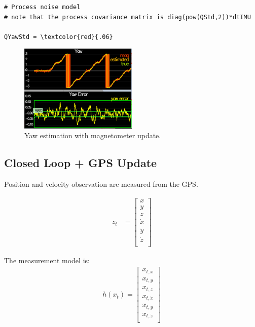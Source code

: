 \documentclass[letterpaper]{article}
\begin{document}
\begin{Verbatim}[frame=single, commandchars=\\\{\}]
# Process noise model
# note that the process covariance matrix is diag(pow(QStd,2))*dtIMU

QYawStd = \textcolor{red}{.06}
\end{Verbatim}

\begin{figure}[ht]
\centering
\includegraphics[width=0.5\textwidth]{./images/scenario10_2.png}
\caption{\label{fig:magnetometer_update} Yaw estimation with magnetometer update.}
\end{figure}

\subsection{Closed Loop + GPS Update}

Position and velocity observation are measured from the GPS.

\begin{align*}
  z_t &= \left[ \begin{array}{c}
      x\\
      y\\
      z\\
      \dot{x}\\
      \dot{y}\\
      \dot{z}\\
      \end{array} \right]
\end{align*}

The measurement model is: 
\begin{align*}
  h(x_t) = \left[\begin{array}{c}
      x_{t,x}\\
      x_{t,y}\\
      x_{t,z}\\
      x_{t,\dot{x}}\\
      x_{t,\dot{y}}\\
      x_{t,\dot{z}}\\
    \end{array}\right]
\end{align*}
\end{document}
